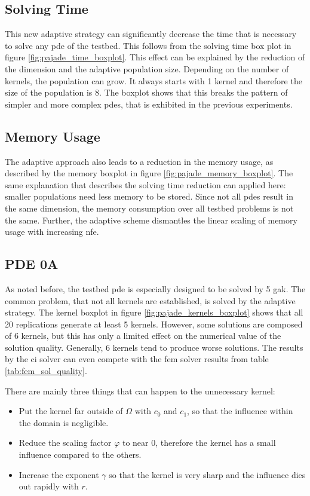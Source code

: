 \documentclass[./\jobname.tex]{subfiles}
\begin{document}
\subsection{Solving Time}

This new adaptive strategy can significantly decrease the time that is necessary to solve any \gls{pde} of the testbed. This follows from the solving time box plot in figure \ref{fig:pajade_time_boxplot}. This effect can be explained by the reduction of the dimension and the adaptive population size. Depending on the number of kernels, the population can grow. It always starts with 1 kernel and therefore the size of the population is 8. The boxplot shows that this breaks the pattern of simpler and more complex \gls{pde}s, that is exhibited in the previous experiments.

\subsection{Memory Usage}
The adaptive approach also leads to a reduction in the memory usage, as described by the memory boxplot in figure \ref{fig:pajade_memory_boxplot}. The same explanation that describes the solving time reduction can applied here: smaller populations need less memory to be stored. Since not all \gls{pde}s result in the same dimension, the memory consumption over all testbed problems is not the same. Further, the adaptive scheme dismantles the linear scaling of memory usage with increasing \gls{nfe}. 

\subsection{PDE 0A}
\label{chap:ex2_discussion_pde0a}
As noted before, the testbed \gls{pde} is especially designed to be solved by 5 \gls{gak}. The common problem, that not all kernels are established, is solved by the adaptive strategy. The kernel boxplot in figure \ref{fig:pajade_kernels_boxplot} shows that all 20 replications generate at least 5 kernels. However, some solutions are composed of 6 kernels, but this has only a limited effect on the numerical value of the solution quality. Generally, 6 kernels tend to produce worse solutions. The results by the \gls{ci} solver can even compete with the \gls{fem} solver results from table \ref{tab:fem_sol_quality}.

There are mainly three things that can happen to the unnecessary kernel: 
\begin{itemize}
	\item Put the kernel far outside of $\Omega$ with $c_0$ and $c_1$, so that the influence within the domain is negligible.
	\item Reduce the scaling factor $\varphi$ to near 0, therefore the kernel has a small influence compared to the others.
	\item Increase the exponent $\gamma$ so that the kernel is very sharp and the influence dies out rapidly with $r$.
\end{itemize}
\end{document}
